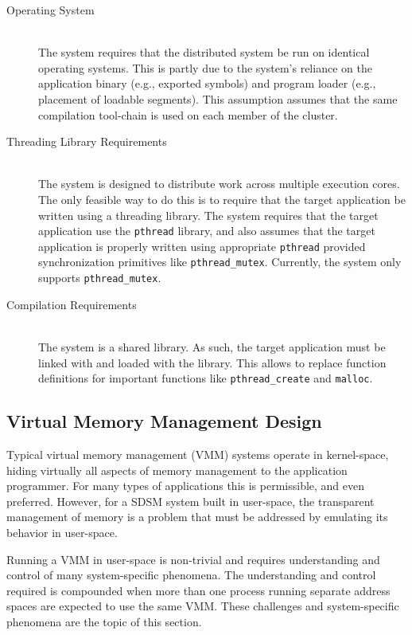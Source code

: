 \begin{description}
\item[Operating System] \hfill \\
The \projname{} system requires that the distributed system be run on identical operating systems.  This is partly due to the system's reliance on the application binary (e.g., exported symbols) and program loader (e.g., placement of loadable segments).  This assumption assumes that the same compilation tool-chain is used on each member of the cluster.

\item[Threading Library Requirements] \hfill \\
 The \projname{} system is designed to distribute work across multiple execution cores.  The only feasible way to do this is to require that the target application be written using a threading library.  The \projname{} system requires that the target application use the \verb,pthread, library, and also assumes that the target application is properly written using appropriate \verb,pthread, provided synchronization primitives like \verb,pthread_mutex,.  Currently, the \projname{} system only supports \verb,pthread_mutex,.

\item[Compilation Requirements] \hfill \\
The \projname{} system is a shared library.  As such, the target application must be linked with and loaded with the \projname{} library.  This allows \projname{} to replace function definitions for important functions like \verb,pthread_create, and \verb,malloc,.
\end{description}


\subsection{Virtual Memory Management Design}
\label{vmm-design}

Typical virtual memory management (VMM) systems operate in kernel-space, hiding virtually all aspects of memory management to the application programmer.  For many types of applications this is permissible, and even preferred.  However, for a SDSM system built in user-space, the transparent management of memory is a problem that must be addressed by emulating its behavior in user-space.

Running a VMM in user-space is non-trivial and requires understanding and control of many system-specific phenomena.  The understanding and control required is compounded when more than one process running separate address spaces are expected to use the same VMM.  These challenges and system-specific phenomena are the topic of this section.

